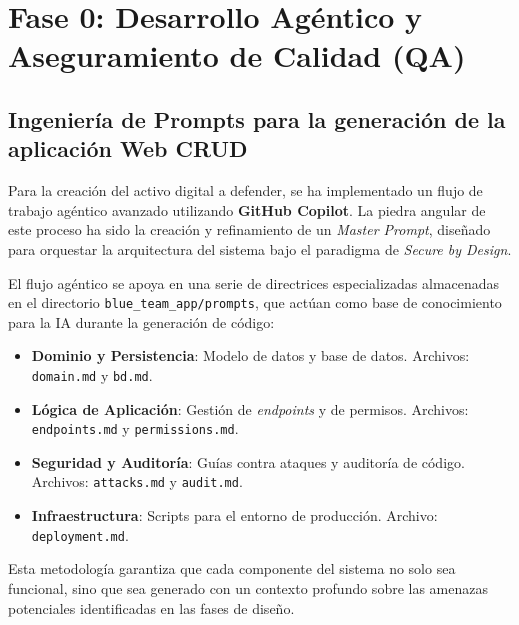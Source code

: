 \chapter[Fase 0: Desarrollo Agéntico y QA]{Fase 0: Desarrollo Agéntico y Aseguramiento de Calidad (QA)}
\label{chap:fase_0_desarrollo_agentico}

\section[Ingeniería de Prompts y Web CRUD]{Ingeniería de Prompts para la generación de la aplicación Web CRUD}
\label{sec:ingenieria_prompts}

Para la creación del activo digital a defender, se ha implementado un flujo de trabajo agéntico avanzado utilizando \textbf{GitHub Copilot}. La piedra angular de este proceso ha sido la creación y refinamiento de un \textit{Master Prompt}, diseñado para orquestar la arquitectura del sistema bajo el paradigma de \textit{Secure by Design}.

El flujo agéntico se apoya en una serie de directrices especializadas almacenadas en el directorio \texttt{blue\_team\_app/}\allowbreak\texttt{prompts}, que actúan como base de conocimiento para la IA durante la generación de código:
\begin{itemize}
    \item \textbf{Dominio y Persistencia}: Modelo de datos y base de datos. \newline Archivos: \texttt{domain.md} y \texttt{bd.md}.
    \item \textbf{Lógica de Aplicación}: Gestión de \textit{endpoints} y de permisos. \newline Archivos: \texttt{endpoints.md} y \texttt{permissions.md}.
    \item \textbf{Seguridad y Auditoría}: Guías contra ataques y auditoría de código. \newline Archivos: \texttt{attacks.md} y \texttt{audit.md}.
    \item \textbf{Infraestructura}: Scripts para el entorno de producción. \newline Archivo: \texttt{deployment.md}.
\end{itemize}

Esta metodología garantiza que cada componente del sistema no solo sea funcional, sino que sea generado con un contexto profundo sobre las amenazas potenciales identificadas en las fases de diseño.

